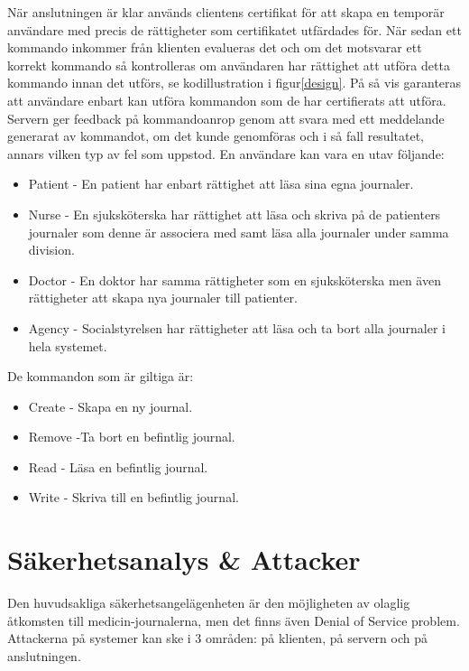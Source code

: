 \documentclass[titlepage,a4paper]{article}
\begin{document}
När anslutningen är klar används clientens certifikat för att skapa en temporär användare med precis de rättigheter som certifikatet utfärdades för. När sedan ett kommando inkommer från klienten evalueras det och om det motsvarar ett korrekt kommando så kontrolleras om användaren har rättighet att utföra detta kommando innan det utförs, se kodillustration i figur\ref{design}. På så vis garanteras att användare enbart kan utföra kommandon som de har certifierats att utföra. Servern ger feedback på kommandoanrop genom att svara med ett meddelande generarat av kommandot, om det kunde genomföras och i så fall resultatet, annars vilken typ av fel som uppstod.
\newline
\newline
En användare kan vara en utav följande:
\begin{itemize}
\item Patient - En patient har enbart rättighet att läsa sina egna journaler.
\item Nurse - En sjuksköterska har rättighet att läsa och skriva på de patienters journaler som denne är associera med samt läsa alla journaler under samma division.
\item Doctor - En doktor har samma rättigheter som en sjuksköterska men även rättigheter att skapa nya journaler till patienter.
\item Agency - Socialstyrelsen har rättigheter att läsa och ta bort alla journaler i hela systemet.
\end{itemize}

De kommandon som är giltiga är:
\begin{itemize}
\item Create - Skapa en ny journal.
\item Remove -Ta bort en befintlig journal.
\item Read - Läsa en befintlig journal.
\item Write - Skriva till en befintlig journal.
\end{itemize}


\section{Säkerhetsanalys  \& Attacker}
Den huvudsakliga säkerhetsangelägenheten är den möjligheten av olaglig åtkomsten till medicin-journalerna, men det finns även Denial of Service problem. Attackerna på systemer kan ske i 3 områden: på klienten, på servern och på anslutningen.
\end{document}
